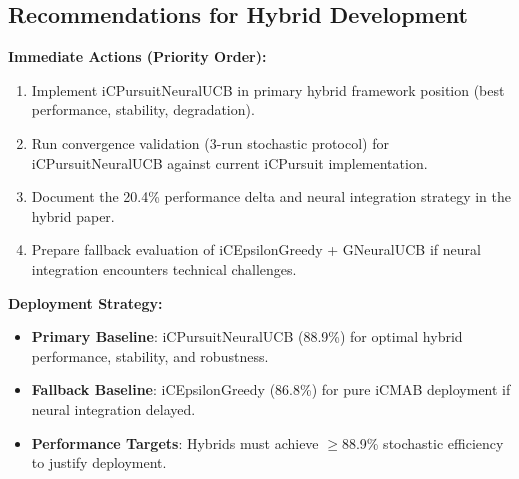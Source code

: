 \documentclass[12pt,a4paper]{article}
\begin{document}
\subsection{Recommendations for Hybrid Development}

\textbf{Immediate Actions (Priority Order):}
\begin{enumerate}
\item Implement iCPursuitNeuralUCB in primary hybrid framework position (best performance, stability, degradation).
\item Run convergence validation (3-run stochastic protocol) for iCPursuitNeuralUCB against current iCPursuit implementation.
\item Document the 20.4\% performance delta and neural integration strategy in the hybrid paper.
\item Prepare fallback evaluation of iCEpsilonGreedy + GNeuralUCB if neural integration encounters technical challenges.
\end{enumerate}

\textbf{Deployment Strategy:}
\begin{itemize}
\item \textbf{Primary Baseline}: iCPursuitNeuralUCB (88.9\%) for optimal hybrid performance, stability, and robustness.
\item \textbf{Fallback Baseline}: iCEpsilonGreedy (86.8\%) for pure iCMAB deployment if neural integration delayed.
\item \textbf{Performance Targets}: Hybrids must achieve $\geq$88.9\% stochastic efficiency to justify deployment.
\end{itemize}
\end{document}
